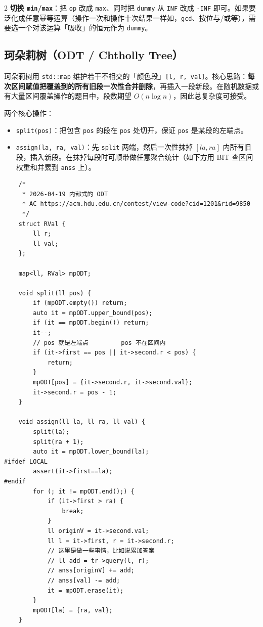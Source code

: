 \begin{multicols*}{2}
	\textbf{切换 \texttt{min}/\texttt{max}}：把 \verb|op| 改成 \verb|max|、同时把 \verb|dummy| 从 \verb|INF| 改成 \verb|-INF| 即可。如果要泛化成任意幂等运算（操作一次和操作十次结果一样如，\verb|gcd|、按位与/或等），需要选一个对该运算「吸收」的恒元作为 \verb|dummy|。

	\subsection{珂朵莉树（ODT / Chtholly Tree）}

	珂朵莉树用 \verb|std::map| 维护若干不相交的「颜色段」\verb|[l, r, val]|。核心思路：\textbf{每次区间赋值把覆盖到的所有旧段一次性合并删除}，再插入一段新段。在随机数据或有大量区间覆盖操作的题目中，段数期望 $O(n \log n)$，因此总复杂度可接受。

	两个核心操作：
	\begin{itemize}
		\item \verb|split(pos)|：把包含 \verb|pos| 的段在 \verb|pos| 处切开，保证 \verb|pos| 是某段的左端点。
		\item \verb|assign(la, ra, val)|：先 \verb|split| 两端，然后一次性抹掉 $[la, ra]$ 内所有旧段，插入新段。在抹掉每段时可顺带做任意聚合统计（如下方用 BIT 查区间权重和并累到 \verb|anss| 上）。
	\end{itemize}

	\begin{verbatim}
	/*
	 * 2026-04-19 内部式的 ODT
	 * AC https://acm.hdu.edu.cn/contest/view-code?cid=1201&rid=9850
	 */
	struct RVal {
		ll r;
		ll val;
	};

	map<ll, RVal> mpODT;

	void split(ll pos) {
		if (mpODT.empty()) return;
		auto it = mpODT.upper_bound(pos);
		if (it == mpODT.begin()) return;
		it--;
		// pos 就是左端点         pos 不在区间内
		if (it->first == pos || it->second.r < pos) {
			return;
		}
		mpODT[pos] = {it->second.r, it->second.val};
		it->second.r = pos - 1;
	}

	void assign(ll la, ll ra, ll val) {
		split(la);
		split(ra + 1);
		auto it = mpODT.lower_bound(la);
#ifdef LOCAL
		assert(it->first==la);
#endif
		for (; it != mpODT.end();) {
			if (it->first > ra) {
				break;
			}
			ll originV = it->second.val;
			ll l = it->first, r = it->second.r;
			// 这里是做一些事情，比如说累加答案
			// ll add = tr->query(l, r);
			// anss[originV] += add;
			// anss[val] -= add;
			it = mpODT.erase(it);
		}
		mpODT[la] = {ra, val};
	}
	\end{verbatim}


\end{multicols*}
